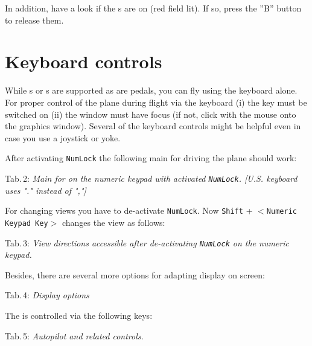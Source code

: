 In addition, have a look if the s are on (red field lit). If so, press the ''B'' button to release them.

\section{Keyboard controls}

While s or s are supported as are  pedals, you
can fly \FlightGear{} using the keyboard alone. For proper control of the plane during
flight via the keyboard (i) the \texttt{} key must be switched on (ii) the
\FlightGear{} window must have focus (if not, click with the mouse onto the graphics
window). Several of the keyboard controls might be helpful even in case you use a
joystick or yoke.

After activating \texttt{NumLock} the following main  for driving the plane should work:
 \eject

\noindent
 Tab.\,2: \textit{Main  for \FlightGear{} on the
 numeric keypad with activated \texttt{NumLock}.
 [U.S. keyboard uses "." instead of ","]}
\medskip

\centerline{}
\vskip5mm

For changing views you have to de-activate \texttt{NumLock}. Now \texttt{Shift} +
$<$\texttt{Numeric Keypad Key}$>$ changes the view as follows:
\medskip

\noindent
 Tab.\,3: \textit{View directions
accessible after de-activating \texttt{NumLock} on the numeric keypad.}
\medskip

\centerline{}
\vskip5mm

Besides, there are several more options for adapting display on screen:
\vfill
\eject

\noindent
 Tab.\,4: \textit{Display options}
\medskip

\centerline{}
\vskip5mm

The  is controlled via the following keys:
\medskip

\noindent
 Tab.\,5: \textit{Autopilot and related controls.}
\medskip

